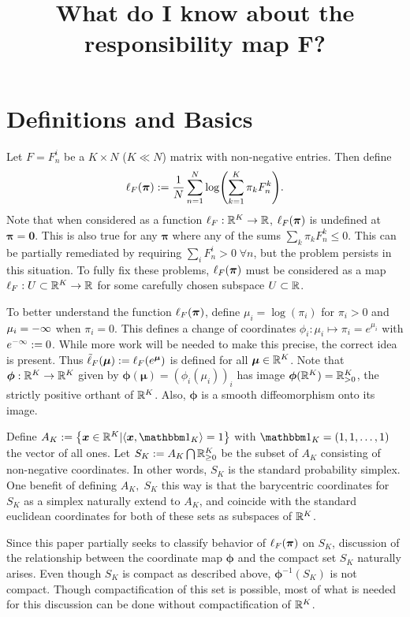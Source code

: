 \documentclass[12pt,letterpaper]{amsbook}
\title{What do I know about the responsibility map \Rpi F?}
\begin{document}
\maketitle
\chapter{Definitions and Basics}
	Let \( F = F^i_n \) be a \( K\times N \) (\( K\ll N \)) matrix with non-negative entries. Then define 
	\begin{equation}\label{eqn:ellDef}
		\elpi F := \frac{1}{N}\sum_{n=1}^{N} \log(\sum_{k=1}^{K} \pi_kF^k_n).
	\end{equation}
	Note that when considered as a function \( \ell_F:\R^K\rightarrow \R \), \( \elpi F \) is undefined at \( \bm\pi = \bm 0 \). This is also true for any \( \bm\pi \) where any of the sums \( \sum_k \pi_k F_n^k
	\leq 0 \). This can be partially remediated by requiring \( \sum_i F^i_n >0\;\forall n \), but the problem persists in this situation.  To fully fix these problems, \( \elpi F \) must be considered as a map \( \ell_F:U\subset\R^K\rightarrow\R \) for some carefully chosen subspace \( U\subset \R \).
	
	To better understand the function \( \elpi F \), define \( \mu_i = \log(\pi_i) \) for \( \pi_i>0 \) and \( \mu_i = -\oo \) when \( \pi_i = 0 \). This defines a change of coordinates \( \phi_i:\mu_i\mapsto \pi_i = e^{\mu_i} \) with \( e^{-\oo}:=0 \). While more work will be needed to make this precise, the correct idea is present. Thus \( \tilde{\ell}_F(\bm\mu) := \elpi[e^{\bm\mu}]{F} \) is defined for all \( \bm\mu\in\R^K \).  Note that \( \bm\phi:\R^K\rightarrow\R^K \) given by \( \bm\phi(\bm\mu) = \left(\phi_i(\mu_i)\right)_i \) has image \( \bm\phi(\R^K) = \R^K_{>0} \), the strictly positive orthant of \( \R^K \). Also, \( \bm\phi \) is a smooth diffeomorphism onto its image.
	
	Define \( A_K := \left\{\bm x\in\R^K|\<\bm x,\mathbbm 1_K\> = 1\right\}\) with \( \mathbbm 1_K  = (1,1,\ldots,1)\) the vector of all ones. Let \( S_K := A_K\bigcap \R^{K}_{\geq 0} \) be the subset of \( A_K \) consisting of non-negative coordinates. In other words, \( S_K \) is the standard probability simplex.  One benefit of defining \( A_K,\;S_K \) this way is that the barycentric coordinates for \( S_K \) as a simplex naturally extend to \( A_K \), and coincide with the standard euclidean coordinates for both of these sets as subspaces of \( \R^K \).  
	
	Since this paper partially seeks to classify behavior of  \( \elpi{F} \) on \( S_K \), discussion of the relationship between the coordinate map \( \bm\phi \)  and the compact set \( S_K \) naturally arises.  Even though \( S_K \) is compact as described above, \( \bm\phi^{-1}(S_K) \) is not compact.  Though compactification of this set is possible, most of what is needed for this discussion can be done without compactification of \( \R^K \).
	
\end{document}
